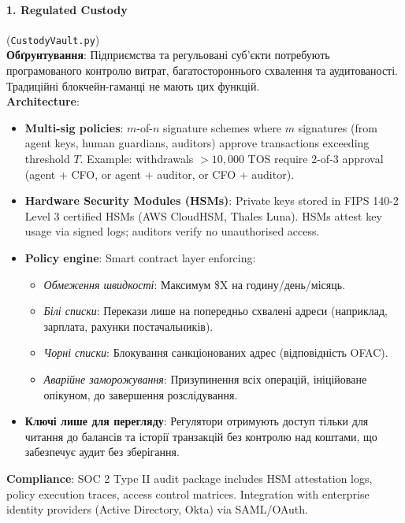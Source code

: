 \documentclass[11pt]{article}
\begin{document}
\paragraph{1. Regulated Custody} (\texttt{CustodyVault.py})\\
\textbf{Обґрунтування}: Підприємства та регульовані суб'єкти потребують програмованого контролю витрат, багатостороннього схвалення та аудитованості. Традиційні блокчейн-гаманці не мають цих функцій.\\
\textbf{Architecture}:
\begin{itemize}[noitemsep]
  \item \textbf{Multi-sig policies}: $m$-of-$n$ signature schemes where $m$ signatures (from agent keys, human guardians, auditors) approve transactions exceeding threshold $T$. Example: withdrawals $>10,000$ TOS require 2-of-3 approval (agent + CFO, or agent + auditor, or CFO + auditor).
  \item \textbf{Hardware Security Modules (HSMs)}: Private keys stored in FIPS 140-2 Level 3 certified HSMs (AWS CloudHSM, Thales Luna). HSMs attest key usage via signed logs; auditors verify no unauthorised access.
  \item \textbf{Policy engine}: Smart contract layer enforcing:
    \begin{itemize}[noitemsep]
      \item \emph{Обмеження швидкості}: Максимум \$X на годину/день/місяць.
      \item \emph{Білі списки}: Перекази лише на попередньо схвалені адреси (наприклад, зарплата, рахунки постачальників).
      \item \emph{Чорні списки}: Блокування санкціонованих адрес (відповідність OFAC).
      \item \emph{Аварійне заморожування}: Призупинення всіх операцій, ініційоване опікуном, до завершення розслідування.
    \end{itemize}
  \item \textbf{Ключі лише для перегляду}: Регулятори отримують доступ тільки для читання до балансів та історії транзакцій без контролю над коштами, що забезпечує аудит без зберігання.
\end{itemize}
\textbf{Compliance}: SOC 2 Type II audit package includes HSM attestation logs, policy execution traces, access control matrices. Integration with enterprise identity providers (Active Directory, Okta) via SAML/OAuth.
\end{document}
